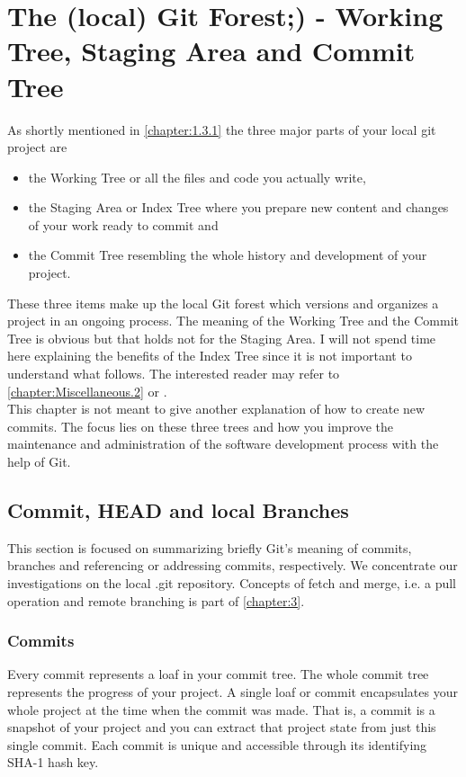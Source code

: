 \chapter{The (local) Git Forest;) - Working Tree, Staging Area and Commit Tree}
\label{chapter:2}

As shortly mentioned in \cref{chapter:1.3.1} the three major parts of your local git project are
\begin{itemize}
	\item the Working Tree or all the files and code you actually write,
	\item the Staging Area or Index Tree where you prepare new content and changes of your work ready to commit and 
	\item the Commit Tree resembling the whole history and development of your project. 
\end{itemize}
These three items make up the local Git forest which versions and organizes a project in an ongoing process. The meaning of the Working Tree and the 
Commit Tree is obvious but that holds not for the Staging Area. I will not spend time here explaining the benefits of the Index Tree 
since it is not important to understand what follows. The interested reader may refer to \cref{chapter:Miscellaneous.2} or 
\cite{sonulohaniWhat2021}. 
\\
This chapter is not meant to give another explanation of how to create new commits. The focus lies on these three trees 
and how you improve the maintenance and administration of the software development process with the help of Git. 

 


\section{Commit, HEAD and local Branches}
\label{chapter:2.1}

This section is focused on summarizing briefly Git's meaning of commits, branches 
and referencing or addressing commits, respectively. We concentrate our investigations on the local 
.git repository. Concepts of fetch and merge, i.e. a pull operation and remote branching is part of \cref{chapter:3}. 



\subsection*{Commits}
  
Every commit represents a loaf in your commit tree. The whole commit tree represents the 
progress of your project. A single loaf or commit encapsulates 
your whole project at the time when the commit was made. That is, a commit is a snapshot 
of your project and you can extract that project state from just this single commit.
Each commit is unique and accessible through its identifying SHA-1 hash key.


